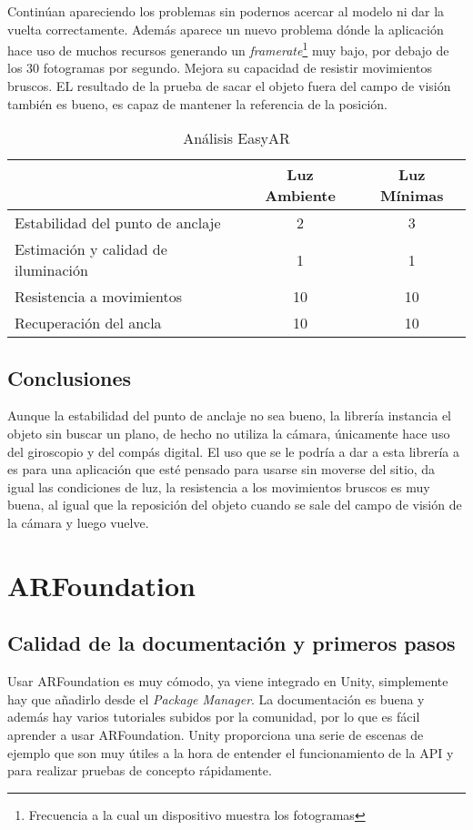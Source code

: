 Continúan apareciendo los problemas sin podernos acercar al modelo ni dar la vuelta correctamente. Además aparece un nuevo problema dónde la aplicación hace uso de muchos recursos generando un \textit{framerate}\footnote{Frecuencia a la cual un dispositivo muestra los fotogramas} muy bajo, por debajo de los 30 fotogramas por segundo. Mejora su capacidad de resistir movimientos bruscos. EL resultado de la prueba de sacar el objeto fuera del campo de visión también es bueno, es capaz de mantener la referencia de la posición.

\begin{table}[H]
    \centering
    \begin{tabular}{|l|c|c|}
    \hline
          & Luz Ambiente & Luz Mínimas \\
         \hline
        Estabilidad del punto de anclaje   &2 &3\\
        \hline
        Estimación y calidad de iluminación  &1 &1 \\
        \hline
        Resistencia a movimientos  &10 &10 \\
        \hline
        Recuperación del ancla  &10 &10 \\
      \hline
    \end{tabular}
    \caption{Análisis EasyAR}
    \label{tab:EasyAR}
\end{table}
\subsection{Conclusiones}
Aunque la estabilidad del punto de anclaje no sea bueno, la librería instancia el objeto sin buscar un plano, de hecho no utiliza la cámara, únicamente hace uso del giroscopio y del compás digital. El uso que se le podría a dar a esta librería a es para una aplicación que esté pensado para usarse sin moverse del sitio, da igual las condiciones de luz, la resistencia a los movimientos bruscos es muy buena, al igual que la reposición del objeto cuando se sale del campo de visión de la cámara y luego vuelve.

\clearpage
\section{ARFoundation}
\subsection{Calidad de la documentación y primeros pasos}
Usar ARFoundation es muy cómodo, ya viene integrado en Unity, simplemente hay que añadirlo desde el \textit{Package Manager}. La documentación es buena y además hay varios tutoriales subidos por la comunidad, por lo que es fácil aprender a usar ARFoundation. Unity proporciona una serie de escenas de ejemplo que son muy útiles a la hora de entender el funcionamiento de la API y para realizar pruebas de concepto rápidamente\cite{UnityGithub}.


